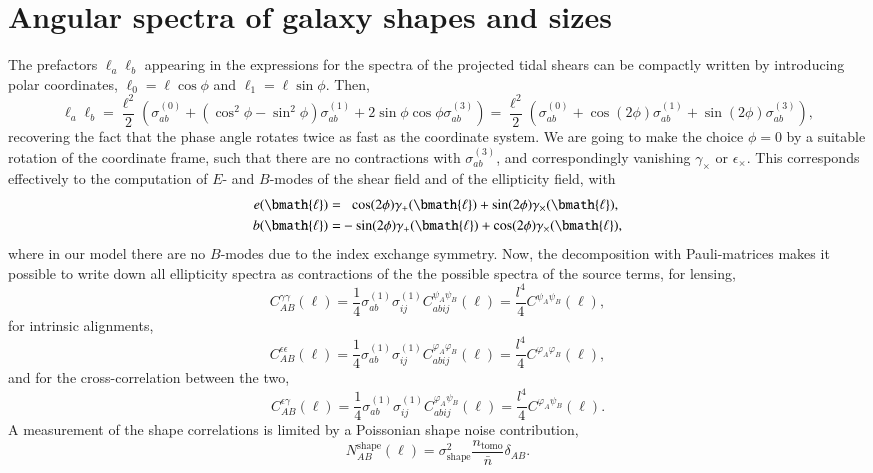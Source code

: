 \documentclass[a4paper,fleqn,usenatbib]{mnras}
\newcommand{\vecl}{\bmath{\ell}}
\begin{document}
\section{Angular spectra of galaxy shapes and sizes}\label{sect_spectra}
The prefactors $\ell_a\ell_b$ appearing in the expressions for the spectra of the projected tidal shears can be compactly written by introducing polar coordinates, $\ell_0 = \ell\cos\phi$ and $\ell_1 = \ell\sin\phi$. Then,
\begin{equation}
\ell_a\ell_b = 
\frac{\ell^2}{2}\left(\sigma^{(0)}_{ab} + (\cos^2\phi-\sin^2\phi)\sigma^{(1)}_{ab} + 2\sin\phi\cos\phi\sigma^{(3)}_{ab}\right) = 
\frac{\ell^2}{2}\left(\sigma^{(0)}_{ab} + \cos(2\phi)\sigma^{(1)}_{ab} + \sin(2\phi)\sigma^{(3)}_{ab}\right),
\end{equation}
recovering the fact that the phase angle rotates twice as fast as the coordinate system. We are going to make the choice $\phi = 0$ by a suitable rotation of the coordinate frame, such that there are no contractions with $\sigma^{(3)}_{ab}$, and correspondingly vanishing $\gamma_\times$ or $\epsilon_\times$. This corresponds effectively to the computation of $E$- and $B$-modes of the shear field and of the ellipticity field, with
\begin{align}
e(\vecl) = &\hphantom{-}\cos(2\phi)\gamma_+(\vecl) + \sin(2\phi)\gamma_\times(\vecl),\\
b(\vecl) = &-\sin(2\phi)\gamma_+(\vecl) + \cos(2\phi)\gamma_\times(\vecl),
\end{align}
where in our model there are no $B$-modes due to the index exchange symmetry. Now, the decomposition with Pauli-matrices makes it possible to write down all ellipticity spectra as contractions of the the possible spectra of the source terms, for lensing,
\begin{equation}
C^{\gamma\gamma}_{AB}(\ell) = \frac{1}{4}\sigma^{(1)}_{ab}\sigma^{(1)}_{ij}C^{\psi_A\psi_B}_{abij}(\ell) = \frac{l^4}{4}C^{\psi_A\psi_B}(\ell),
\end{equation}
for intrinsic alignments,
\begin{equation}
C^{\epsilon\epsilon}_{AB}(\ell) = \frac{1}{4}\sigma^{(1)}_{ab}\sigma^{(1)}_{ij}C^{\varphi_A\varphi_B}_{abij}(\ell) = \frac{l^4}{4}C^{\varphi_A\varphi_B}(\ell),
\end{equation}
and for the cross-correlation between the two,
\begin{equation}
C^{\epsilon\gamma}_{AB}(\ell) = \frac{1}{4}\sigma^{(1)}_{ab}\sigma^{(1)}_{ij}C^{\varphi_A\psi_B}_{abij}(\ell) = \frac{l^4}{4}C^{\varphi_A\psi_B}(\ell).
\end{equation}
A measurement of the shape correlations is limited by a Poissonian shape noise contribution,
\begin{equation}
N_{AB}^\mathrm{shape}(\ell) = \sigma^2_\mathrm{shape}\frac{n_\mathrm{tomo}}{\bar{n}}\delta_{AB}.
\end{equation}
\end{document}
